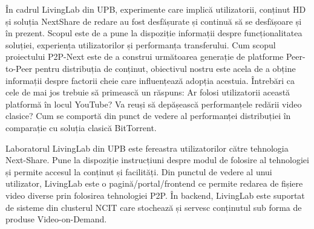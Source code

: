 În cadrul LivingLab din UPB, experimente care implică utilizatorii, conținut
HD și soluția NextShare de redare au fost desfășurate și continuă să se
desfășoare și în prezent. Scopul este de a pune la dispoziție informații despre
funcționalitatea soluției, experiența utilizatorilor și performanța transferului.
Cum scopul proiectului P2P-Next este de a construi următoarea generație de
platforme Peer-to-Peer pentru distribuția de conținut, obiectivul nostru este
acela de a obține informații despre factorii cheie care influențează adopția
acestuia. Întrebări ca cele de mai jos trebuie să primească un răspuns:
Ar folosi utilizatorii această platformă în locul YouTube? Va reuși să
depășească performanțele redării video clasice? Cum se comportă din punct de
vedere al performanței distribuției în comparație cu soluția clasică BitTorrent.

Laboratorul LivingLab din UPB este fereastra utilizatorilor către tehnologia
Next-Share. Pune la dispoziție instrucțiuni despre modul de folosire al
tehnologiei și permite accesul la conținut și facilități. Din punctul de
vedere al unui utilizator, LivingLab este o pagină/portal/frontend ce permite
redarea de fișiere video diverse prin folosirea tehnologiei P2P. În backend,
LivingLab este suportat de sisteme din clusterul NCIT care stochează și servesc
conținutul sub forma de produse Video-on-Demand.


